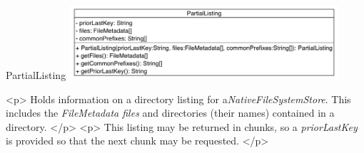 \begin{XeClass}{PartialListing}
\includegraphics[width=10cm]{cdig/PartialListing.png}
     
 <p>
 Holds information on a directory listing for a\emph{NativeFileSystemStore}.
 This includes the \emph{FileMetadata files} and directories
 (their names) contained in a directory.
 </p>
 <p>
 This listing may be returned in chunks, so a \emph{priorLastKey}
 is provided so that the next chunk may be requested.
 </p>

\end{XeClass}
